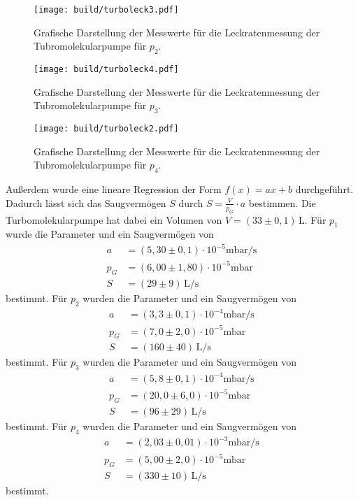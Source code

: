 \begin{figure}[H]
  \centering
  \texttt{[image: build/turboleck3.pdf]}
  \caption{Grafische Darstellung der Messwerte für die Leckratenmessung der Tubromolekularpumpe für $p_2$.}
  \label{fig:turboleck2}
\end{figure}

\begin{figure}[H]
  \centering
  \texttt{[image: build/turboleck4.pdf]}
  \caption{Grafische Darstellung der Messwerte für die Leckratenmessung der Tubromolekularpumpe für $p_3$.}
  \label{fig:turboleck3}
\end{figure}

\begin{figure}[H]
  \centering
  \texttt{[image: build/turboleck2.pdf]}
  \caption{Grafische Darstellung der Messwerte für die Leckratenmessung der Tubromolekularpumpe für $p_4$.}
  \label{fig:turboleck4}
\end{figure}

Außerdem wurde eine lineare Regression der Form $f(x) = ax +b$ durchgeführt. Dadurch lässt sich das Saugvermögen
$S$ durch $S = \frac{V}{p_G}\cdot a$ bestimmen. Die Turbomolekularpumpe hat dabei ein Volumen von
$V = (33 \pm 0,1) \,\si{\liter}$. Für $p_1$ wurde die Parameter und ein Saugvermögen von
\begin{align*}
  a &= (5,30 \pm 0,1)\cdot 10^{-5} \si{\milli\bar\per\second} \\
  p_G &= (6,00 \pm 1,80) \cdot 10^{-5} \si{\milli\bar} \\
  S &= (29 \pm 9)\,\si{\liter\per\second}
\end{align*}
bestimmt. Für $p_2$ wurden die Parameter und ein Saugvermögen von
\begin{align*}
  a &= (3,3 \pm 0,1)\cdot 10^{-4} \si{\milli\bar\per\second} \\
  p_G &= (7,0 \pm 2,0) \cdot 10^{-5} \si{\milli\bar} \\
  S &= (160 \pm 40)\,\si{\liter\per\second}
\end{align*}
bestimmt. Für $p_3$ wurden die Parameter und ein Saugvermögen von
\begin{align*}
  a &= (5,8 \pm 0,1)\cdot 10^{-4} \si{\milli\bar\per\second} \\
  p_G &= (20,0 \pm 6,0) \cdot 10^{-5} \si{\milli\bar} \\
  S &= (96 \pm 29)\,\si{\liter\per\second}
\end{align*}
bestimmt. Für $p_4$ wurden die Parameter und ein Saugvermögen von
\begin{align*}
  a &= (2,03 \pm 0,01)\cdot 10^{-3} \si{\milli\bar\per\second} \\
  p_G &= (5,00 \pm 2,0) \cdot 10^{-5} \si{\milli\bar} \\
  S &= (330 \pm 10)\,\si{\liter\per\second}
\end{align*}
bestimmt.

